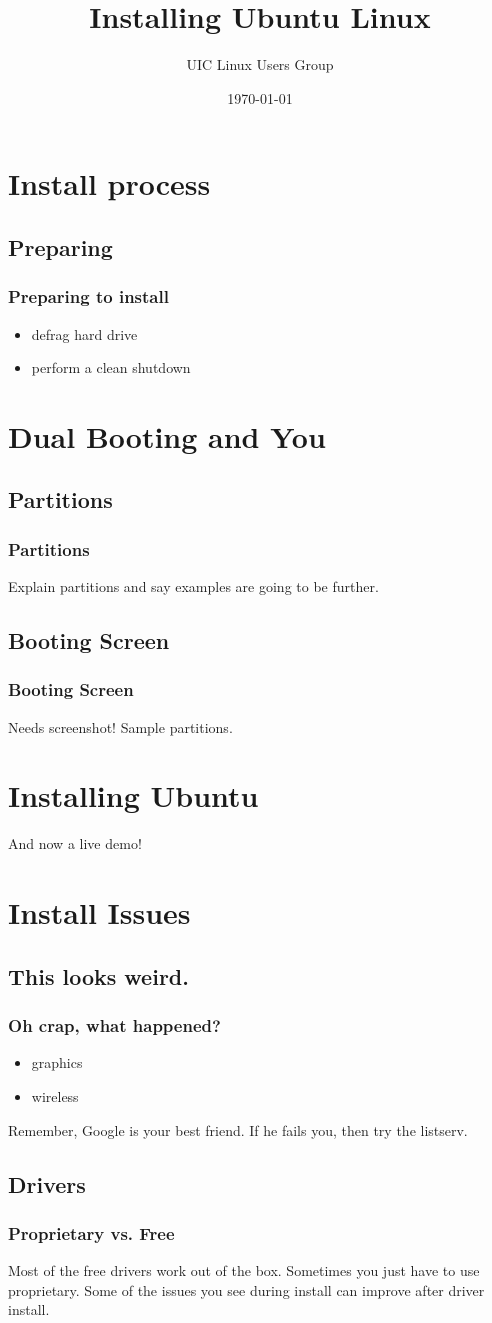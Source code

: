 \documentclass[hyperref={pdfpagelabels=false}]{beamer}
\title{Installing Ubuntu Linux}
\author{UIC Linux Users Group}
\date{\today}
\begin{document}
\frame{\titlepage}
\section[outline]{}
\frame{\tableofcontents}
\section{Install process}
\subsection{Preparing}
\frame
{
    \frametitle{Preparing to install}
    \begin{itemize}
    \item{defrag hard drive}
    \item{perform a clean shutdown}
    \end{itemize}
}
\section{Dual Booting and You}
\subsection{Partitions}
\frame
{
	\frametitle{Partitions}
	Explain partitions and say examples are going to be further.
}
\subsection{Booting Screen}
\frame
{
	\frametitle{Booting Screen}
	Needs screenshot! Sample partitions.
}
\section{Installing Ubuntu}
\frame
{
	And now a live demo!
}
\section{Install Issues}
\subsection{This looks weird.}
\frame
{
	\frametitle{Oh crap, what happened?}
	\begin{itemize}
	\item{graphics}
	\item{wireless}
	\end{itemize}
	Remember, Google is your best friend. If he fails you, then try the listserv.
}
\subsection{Drivers}
\frame
{
	\frametitle{Proprietary vs. Free}
	Most of the free drivers work out of the box. Sometimes you just have to
use proprietary. Some of the issues you see during install can improve after driver install.
}
\end{document}

